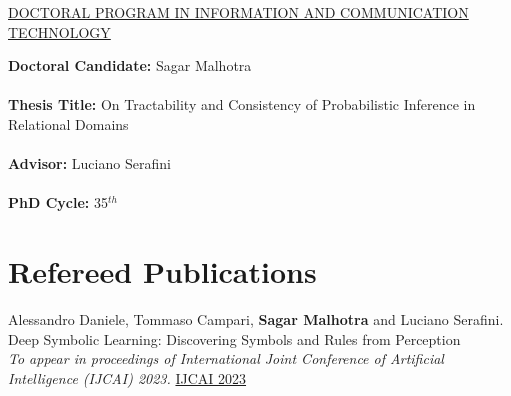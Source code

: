 \documentclass[10pt, a4paper]{article}
\newcommand{\years}[1]{\marginnote{\scriptsize #1}}
\begin{document}
\begin{center}
\underline{DOCTORAL PROGRAM IN
INFORMATION AND COMMUNICATION TECHNOLOGY}
\end{center}
\textbf{Doctoral Candidate:} Sagar Malhotra \\ \\
\textbf{Thesis Title:} On Tractability and Consistency of Probabilistic Inference in Relational Domains\\ \\
\textbf{Advisor:} Luciano Serafini\\ \\
\textbf{PhD Cycle:} 35$^{th}$


\section*{Refereed Publications}

\noindent

\years{2023} Alessandro Daniele, Tommaso Campari, \textbf{Sagar Malhotra} and Luciano Serafini. \\ Deep Symbolic Learning: Discovering Symbols and Rules from Perception \\ \emph{To appear in proceedings of International Joint Conference of Artificial Intelligence (IJCAI) 2023.} \href{https://arxiv.org/abs/2208.11561}{IJCAI 2023}
\end{document}
